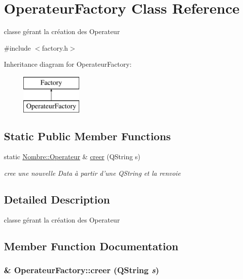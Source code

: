 \hypertarget{classOperateurFactory}{
\section{OperateurFactory Class Reference}
\label{classOperateurFactory}
}


classe gérant la création des Operateur  




{\ttfamily \#include $<$factory.h$>$}

Inheritance diagram for OperateurFactory:\begin{figure}[H]
\begin{center}
\leavevmode
\includegraphics[height=2cm]{classOperateurFactory}
\end{center}
\end{figure}
\subsection*{Static Public Member Functions}
\begin{DoxyCompactItemize}
\item 
static \hyperlink{classNombre_1_1Operateur}{Nombre::Operateur} \& \hyperlink{classOperateurFactory_a0b817d63174f2c7c86020f3d9eebf7ce}{creer} (QString s)
\begin{DoxyCompactList}\small\item\em cree une nouvelle Data à partir d'une QString et la renvoie \item\end{DoxyCompactList}\end{DoxyCompactItemize}


\subsection{Detailed Description}
classe gérant la création des Operateur 

\subsection{Member Function Documentation}
\hypertarget{classOperateurFactory_a0b817d63174f2c7c86020f3d9eebf7ce}{
\subsubsection[{creer}]{ \& OperateurFactory::creer (QString {\em s})}}
\label{classOperateurFactory_a0b817d63174f2c7c86020f3d9eebf7ce}


